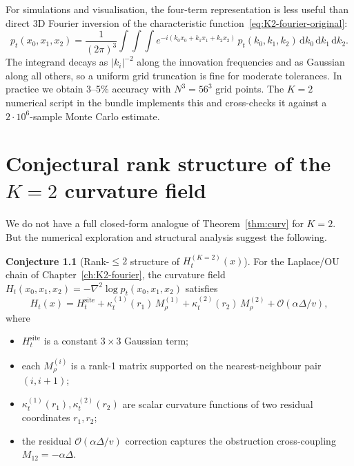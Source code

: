 \documentclass[11pt,a4paper,openany]{book}
\theoremstyle{plainserif}
\theoremstyle{definition}
\newtheorem{conjecture}[theorem]{Conjecture}
\theoremstyle{remarkstyle}
\newcommand{\hatfn}[1]{\widehat{#1}}
\begin{document}
For simulations and visualisation, the four-term representation is less
useful than direct 3D Fourier inversion of the characteristic
function~\eqref{eq:K2-fourier-original}:
\begin{equation}
p_t(x_0, x_1, x_2) = \frac{1}{(2\pi)^3}\int\!\!\int\!\!\int
    e^{-i(k_0 x_0 + k_1 x_1 + k_2 x_2)}\,\hatfn p_t(k_0, k_1, k_2)\,
    \mathrm{d}k_0\,\mathrm{d}k_1\,\mathrm{d}k_2.
\label{eq:3D-Fourier}
\end{equation}
The integrand decays as $|k_i|^{-2}$ along the innovation frequencies
and as Gaussian along all others, so a uniform grid truncation is fine
for moderate tolerances. In practice we obtain 3--5\% accuracy with
$N^3 = 56^3$ grid points. The $K=2$ numerical script in the bundle
implements this and cross-checks it against a $2\cdot 10^6$-sample Monte
Carlo estimate.

\chapter{Conjectural rank structure of the $K{=}2$ curvature field}
\label{ch:K2-conj}

We do not have a full closed-form analogue of
Theorem~\ref{thm:curv} for $K=2$. But the numerical exploration and
structural analysis suggest the following.

\begin{conjecture}[Rank-$\leq 2$ structure of $H_t^{(K=2)}(x)$]
\label{conj:K2-rank}
For the Laplace/OU chain of Chapter~\ref{ch:K2-fourier}, the curvature
field $H_t(x_0, x_1, x_2) = -\nabla^2 \log p_t(x_0,x_1,x_2)$ satisfies
\begin{equation}
H_t(x) = H_t^{\mathrm{site}} + \kappa_t^{(1)}(r_1)\, M_\rho^{(1)}
        + \kappa_t^{(2)}(r_2)\, M_\rho^{(2)} + \mathcal O(\alpha\Delta/v),
\end{equation}
where
\begin{itemize}[leftmargin=2em]
\item $H_t^{\mathrm{site}}$ is a constant $3\times 3$ Gaussian term;
\item each $M_\rho^{(i)}$ is a rank-1 matrix supported on the
nearest-neighbour pair $(i, i+1)$;
\item $\kappa_t^{(1)}(r_1), \kappa_t^{(2)}(r_2)$ are scalar curvature
functions of two residual coordinates $r_1, r_2$;
\item the residual $\mathcal O(\alpha\Delta/v)$ correction captures the
obstruction cross-coupling $M_{12} = -\alpha\Delta$.
\end{itemize}
\end{conjecture}
\end{document}
